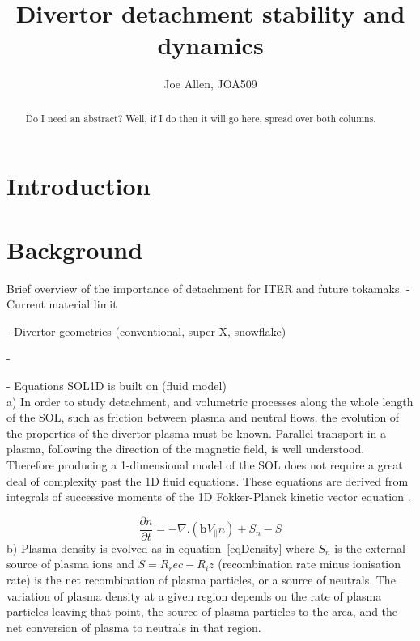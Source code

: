 \documentclass[11pt]{article}  %
\begin{document}
\title{Divertor detachment stability and dynamics}
\author{Joe Allen, JOA509}

    \maketitle
    \begin{abstract}
\noindent Do I need an abstract? Well, if I do then it will go here, spread over both columns. 
	\end{abstract}


\section{Introduction}\label{secIntro}

\section{Background}\label{secBg}
Brief overview of the importance of detachment for ITER and future tokamaks.
- Current material limit

- Divertor geometries (conventional, super-X, snowflake)

- 


- Equations SOL1D is built on (fluid model)\\
a) In order to study detachment, and volumetric processes along the whole length of the SOL, such as friction between plasma and neutral flows, the evolution of the properties of the divertor plasma must be known. Parallel transport in a plasma, following the direction of the magnetic field, is well understood. Therefore producing a 1-dimensional model of the SOL does not require a great deal of complexity past the 1D fluid equations. These equations are derived from integrals of successive moments of the 1D Fokker-Planck kinetic vector equation \cite{Stangeby}.

\begin{equation}\label{eqDensity}
\frac{\partial n}{\partial t} = -\nabla . (\textbf{b}V_{\parallel}n) + S_n - S
\end{equation}
b) Plasma density is evolved as in equation~\ref{eqDensity} where $S_n$ is the external source of plasma ions and $S=R_rec - R_iz$ (recombination rate minus ionisation rate) is the net recombination of plasma particles, or a source of neutrals. The variation of plasma density at a given region depends on the rate of plasma particles leaving that point, the source of plasma particles to the area, and the net conversion of plasma to neutrals in that region.
\end{document}
